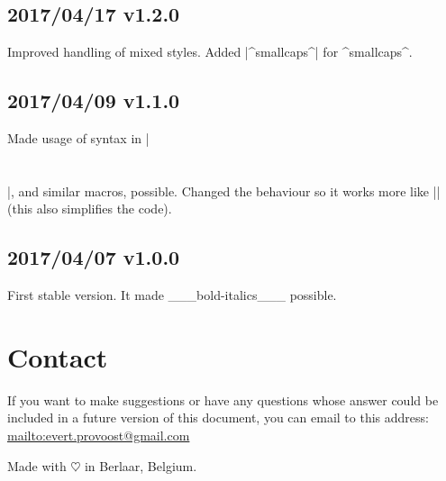 \documentclass[11pt, cm-default]{l3doc}
\begin{document}
	\subsection*{2017/04/17 v1.2.0}
	Improved handling of mixed styles. Added |^smallcaps^| for ^smallcaps^.

	\subsection*{2017/04/09 v1.1.0}
	Made usage of syntax in |\section{}|, and similar macros, possible. Changed the
	behaviour so it works more like |\emph{}| (this also simplifies the code).

	\subsection*{2017/04/07 v1.0.0}
	First stable version. It made ___bold-italics___ possible.


	\section{Contact\label{contact}}
	If you want to make suggestions or have any questions whose answer could be
	included in a future version of this document, you can email to this address:
	\url{mailto:evert.provoost@gmail.com}

	\vspace*{\fill}\noindent
	Made with $\heartsuit$ in Berlaar, Belgium.
	\clearpage
\end{document}
